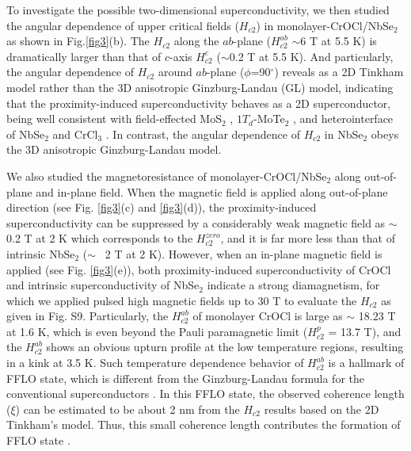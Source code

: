 \documentclass[%
 reprint,
superscriptaddress,
 amsmath,amssymb,
 aps,
]{revtex4-2}
\begin{document}
To investigate the possible two-dimensional superconductivity, we then studied the angular dependence of upper critical fields ($H_{c2}$) in monolayer-CrOCl/NbSe$_2$ as shown in Fig.\ref{fig3}(b). The $H_{c2}$ along the $ab$-plane ($H_{c2}^{ab}$ $\sim$6 T at 5.5 K) is dramatically larger than that of $c$-axis $H_{c2}^{c}$ ($\sim$0.2 T at 5.5 K). And particularly, the angular dependence of $H_{c2}$ around $ab$-plane ($\phi$=90$^{\circ}$) reveals as a 2D Tinkham model rather than the 3D anisotropic Ginzburg-Landau (GL) model, indicating that the proximity-induced superconductivity behaves as a 2D superconductor, being well consistent with field-effected MoS$_2$ \cite{MoS2_1, MoS2_2}, $1T_{d}$-MoTe$_2$ \cite{MoTe2}, and heterointerface of NbSe$_2$ and CrCl$_3$ \cite{NSCrCl}. In contrast, the angular dependence of $H_{c2}$ in NbSe$_2$ obeys the 3D anisotropic Ginzburg-Landau model.

We also studied the magnetoresistance of monolayer-CrOCl/NbSe$_2$ along out-of-plane and in-plane field. When the magnetic field is applied along out-of-plane direction (see Fig. \ref{fig3}(c) and \ref{fig3}(d)), the proximity-induced superconductivity can be suppressed by a considerably weak magnetic field as $\sim$~ 0.2 T at 2 K which corresponds to the $H_{c2}^{zero}$, and it is far more less than that of intrinsic NbSe$_2$ ($\sim$~ 2 T at 2 K). However, when an in-plane magnetic field is applied (see Fig. \ref{fig3}(e)), both proximity-induced superconductivity of CrOCl and intrinsic superconductivity of NbSe$_2$ indicate a strong diamagnetism, for which we applied pulsed high magnetic fields up to 30 T to evaluate the $H_{c2}$ as given in Fig. S9. Particularly, the $H_{c2}^{ab}$ of monolayer CrOCl is large as $\sim$ 18.23 T at 1.6 K, which is even beyond the Pauli paramagnetic limit ($H_{c2}^{p}$ = 13.7 T), and the $H_{c2}^{ab}$ shows an obvious upturn profile at the low temperature regions, resulting in a kink at 3.5 K. Such temperature dependence behavior of $H_{c2}^{ab}$ is a hallmark of FFLO state, which is different from the Ginzburg-Landau formula for the conventional superconductors \cite{Ising, NbS2, Abrikosov}. In this FFLO state, the observed coherence length ($\xi$) can be estimated to be about 2 nm from the $H_{c2}$ results based on the 2D Tinkham's model. Thus, this small coherence length contributes the formation of FFLO state \cite{FFLO_PRX}.

\end{document}
